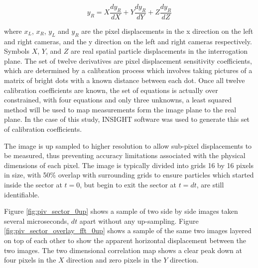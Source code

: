 \begin{equation}
y_R= X\frac{dy_R}{dX} + Y\frac{dy_R}{dY} + Z\frac{dy_R}{dZ}
\label{eq:piv_to_real4}
\end{equation}

where $x_L$, $x_R$, $y_L$ and $y_R$ are the pixel displacements in the x 
direction on the left and right cameras, and the y direction on the left and 
right cameras respectively. Symbols $X$, $Y$, and $Z$ are real spatial particle 
displacements in the interrogation plane. The set of twelve derivatives are 
pixel displacement sensitivity coefficients, which are determined by a 
calibration process which involves taking pictures of a matrix of bright dots 
with a known distance between each dot. Once all twelve calibration 
coefficients are known, the set of equations is actually over constrained, with 
four equations and only three unknowns, a least squared method will be used to 
map measurements form the image plane to the real plane. In the case of this 
study, INSIGHT software was used to generate this set of calibration 
coefficients.

The image is 
up sampled to higher resolution to allow sub-pixel displacements to be 
measured, thus preventing accuracy limitations associated with the physical 
dimensions of each pixel. The image is typically divided into grids 16 by 16 
pixels in size, with 50\% overlap with surrounding grids to ensure particles 
which started inside the sector at $t=0$, but begin to exit the sector at 
$t=dt$, are still identifiable.  


Figure \ref{fig:piv_sector_0up} shows a sample of two side by side images taken 
several microseconds, $dt$ apart without any up-sampling. Figure 
\ref{fig:piv_sector_overlay_fft_0up} shows a sample of the same two images 
layered on top of each other to show the apparent horizontal displacement 
between the two images. The two dimensional correlation map shows a clear peak 
down at four pixels in the $X$ direction and zero pixels in the $Y$ direction.


